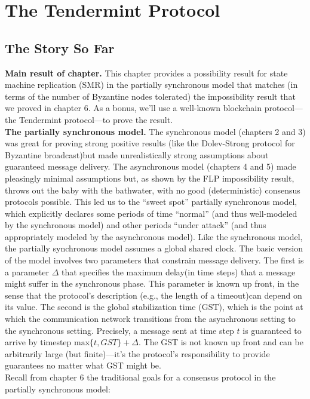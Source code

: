 \chapter{The Tendermint Protocol}
\section{The Story So Far}
\noindent
\textbf{Main result of chapter.}
 This chapter provides a possibility result for state machine replication (SMR) in the partially synchronous model that matches (in terms of the number of 
Byzantine nodes tolerated) the impossibility result that we proved in chapter 6. As a bonus,
we’ll use a well-known blockchain protocol—the Tendermint protocol—to prove the result.\\

\noindent
\textbf{The partially synchronous model.} 
The synchronous model (chapters 2 and 3) was great for proving strong positive results (like the Dolev-Strong protocol for Byzantine 
broadcast)but made unrealistically strong assumptions about guaranteed message delivery. The asynchronous model (chapters 4 and 5) made 
pleasingly minimal assumptions but, as shown by the FLP impossibility result, throws out the baby with the bathwater, with no good 
(deterministic) consensus protocols possible. This led us to the “sweet spot” partially synchronous model, which explicitly declares 
some periods of time “normal” (and thus well-modeled by the synchronous model) and other periods “under attack” (and thus appropriately
 modeled by the asynchronous model). Like the synchronous model, the partially synchronous model assumes a global shared clock. The basic
 version of the model involves two parameters that constrain message delivery. The first is a parameter $\Delta$ that specifies the
 maximum delay(in time steps) that a message might suffer in the synchronous phase. This parameter is known up front, in the sense that 
 the protocol’s description (e.g., the length of a timeout)can depend on its value. The second is the global stabilization time (GST), 
 which is the point at which the communication network transitions from the asynchronous setting to the synchronous setting. Precisely, a 
 message sent at time step $t$ is guaranteed to arrive by timestep $\text{max}\{t, GST\} + \Delta$. The GST is not known up front and can 
 be arbitrarily large (but finite)—it’s the protocol’s responsibility to provide guarantees no matter what GST might be.\\Recall from 
 chapter 6 the traditional goals for a consensus protocol in the partially synchronous model:
